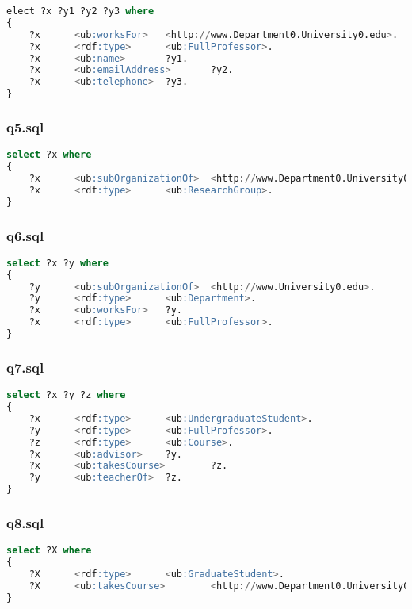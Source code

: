 \documentclass[titlepage, a4paper, 12pt] {article}
\begin{document}
\begin{lstlisting}[language=SQL]
elect ?x ?y1 ?y2 ?y3 where
{
	?x      <ub:worksFor>   <http://www.Department0.University0.edu>.
	?x      <rdf:type>      <ub:FullProfessor>.
	?x      <ub:name>       ?y1.
	?x      <ub:emailAddress>       ?y2.
	?x      <ub:telephone>  ?y3.
}
\end{lstlisting}

\subsubsection{q5.sql}

\begin{lstlisting}[language=SQL]
select ?x where
{
	?x      <ub:subOrganizationOf>  <http://www.Department0.University0.edu>.
	?x      <rdf:type>      <ub:ResearchGroup>.
}
\end{lstlisting}

\subsubsection{q6.sql}

\begin{lstlisting}[language=SQL]
select ?x ?y where
{
	?y      <ub:subOrganizationOf>  <http://www.University0.edu>.
	?y      <rdf:type>      <ub:Department>.
	?x      <ub:worksFor>   ?y.
	?x      <rdf:type>      <ub:FullProfessor>.
}
\end{lstlisting}

\subsubsection{q7.sql}

\begin{lstlisting}[language=SQL]
select ?x ?y ?z where
{
	?x      <rdf:type>      <ub:UndergraduateStudent>.
	?y      <rdf:type>      <ub:FullProfessor>.
	?z      <rdf:type>      <ub:Course>.
	?x      <ub:advisor>    ?y.
	?x      <ub:takesCourse>        ?z.
	?y      <ub:teacherOf>  ?z.
}
\end{lstlisting}

\subsubsection{q8.sql}

\begin{lstlisting}[language=SQL]
select ?X where
{
	?X      <rdf:type>      <ub:GraduateStudent>.
	?X      <ub:takesCourse>        <http://www.Department0.University0.edu/GraduateCourse0>.
}
\end{lstlisting}
\end{document}
